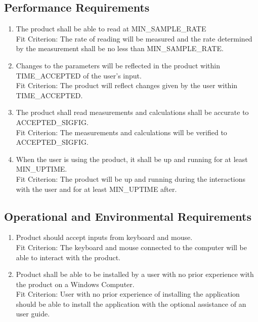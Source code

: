 \documentclass[12pt, titlepage]{article}
\begin{document}
\subsection{Performance Requirements}
\begin{adjustwidth}{2.2em}{0pt}
\begin{enumerate}[{NFR-P}1.]
  \item The product shall be able to read at MIN\_SAMPLE\_RATE\\ \label{NFR-P1}
  Fit Criterion: The rate of reading will be measured and the rate determined by the measurement shall be no less than MIN\_SAMPLE\_RATE. 
  \item Changes to the parameters will be reflected in the product within TIME\_ACCEPTED of the user's input.\\ \label{NFR-P2}
  Fit Criterion: The product will reflect changes given by the user within TIME\_ACCEPTED. 
  \item The product shall read measurements and calculations shall be accurate to ACCEPTED\_SIGFIG.\\ \label{NFR-P3}
  Fit Criterion: The measurements and calculations will be verified to ACCEPTED\_SIGFIG.
  \item When the user is using the product, it shall be up and running for at least MIN\_UPTIME.\\ \label{NFR-P4}
  Fit Criterion: The product will be up and running during the interactions with the user and for at least MIN\_UPTIME after.
\end{enumerate}
\end{adjustwidth}

\subsection{Operational and Environmental Requirements}
\begin{adjustwidth}{2.2em}{0pt}
\begin{enumerate}[{NFR-O}1.]
  \item Product should accept inputs from keyboard and mouse.\\ \label{NFR-O1}
  Fit Criterion: The keyboard and mouse connected to the computer will be able to interact with the product.
  \item Product shall be able to be installed by a user with no prior experience with the product on a Windows Computer.\\ \label{NFR-O2}
  Fit Criterion: User with no prior experience of installing the application should be able to install the application with the optional assistance of an user guide.
\end{enumerate}
\end{adjustwidth}
\end{document}
